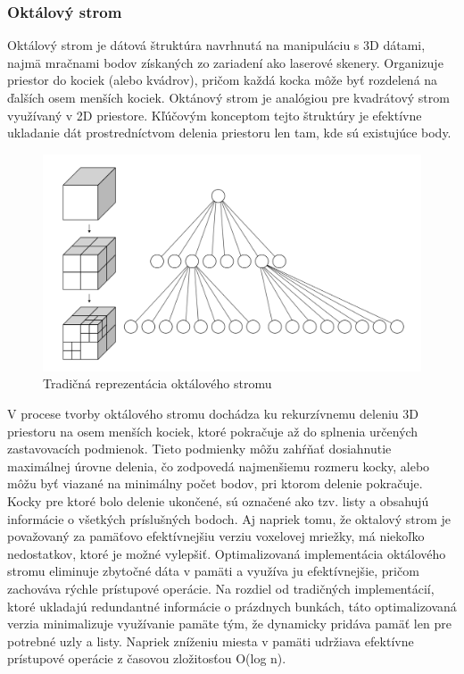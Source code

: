 \subsubsection{Oktálový strom}
\noindent Oktálový strom je dátová štruktúra navrhnutá na manipuláciu s 3D dátami, najmä mračnami bodov získaných zo zariadení ako laserové skenery. Organizuje priestor do kociek (alebo kvádrov), pričom každá kocka môže byť rozdelená na ďalších osem menších kociek. Oktánový strom je analógiou pre kvadrátový strom využívaný v 2D priestore. Kľúčovým konceptom tejto štruktúry je efektívne ukladanie dát prostredníctvom delenia priestoru len tam, kde sú existujúce body. \cite{oct_tree} 
\newline\begin{figure}[!htbp]
  \centering
  \includegraphics[width=12cm]{img/octree_full.png}
  \caption{Tradičná reprezentácia oktálového stromu \cite{oct_tree_img}}
  \label{oct_tree1}
\end{figure}
\newline\indent V procese tvorby oktálového stromu dochádza ku rekurzívnemu deleniu 3D priestoru na osem menších kociek, ktoré pokračuje až do splnenia určených zastavovacích podmienok. Tieto podmienky môžu zahŕňať dosiahnutie maximálnej úrovne delenia, čo zodpovedá najmenšiemu rozmeru kocky, alebo môžu byť viazané na minimálny počet bodov, pri ktorom delenie pokračuje. Kocky pre ktoré bolo delenie ukončené, sú označené ako tzv. listy a obsahujú informácie o všetkých príslušných bodoch. \cite{oct_tree}
\newline\indent Aj napriek tomu, že oktalový strom je považovaný za pamäťovo efektívnejšiu verziu voxelovej mriežky, má niekoľko nedostatkov, ktoré je možné vylepšiť. Optimalizovaná implementácia oktálového stromu eliminuje zbytočné dáta v pamäti a využíva ju efektívnejšie, pričom zachováva rýchle prístupové operácie. Na rozdiel od tradičných implementácií, ktoré ukladajú redundantné informácie o prázdnych bunkách, táto optimalizovaná verzia minimalizuje využívanie pamäte tým, že dynamicky pridáva pamäť len pre potrebné uzly a listy. Napriek zníženiu miesta v pamäti udržiava efektívne prístupové operácie z časovou zložitosťou O(log n). \cite{oct_tree}
